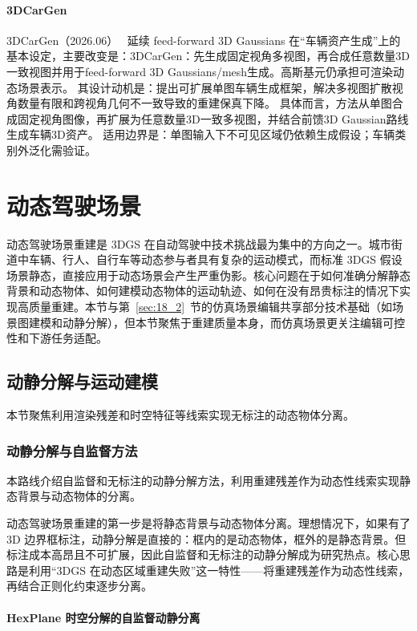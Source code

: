 \paragraph{3DCarGen}
3DCarGen（2026.06）~\cite{2606_24257} 延续 feed-forward 3D Gaussians 在“车辆资产生成”上的基本设定，主要改变是：3DCarGen：先生成固定视角多视图，再合成任意数量3D一致视图并用于feed-forward 3D Gaussians/mesh生成。高斯基元仍承担可渲染动态场景表示。
其设计动机是：提出可扩展单图车辆生成框架，解决多视图扩散视角数量有限和跨视角几何不一致导致的重建保真下降。
具体而言，方法从单图合成固定视角图像，再扩展为任意数量3D一致多视图，并结合前馈3D Gaussian路线生成车辆3D资产。
适用边界是：单图输入下不可见区域仍依赖生成假设；车辆类别外泛化需验证。
\section{动态驾驶场景}
\label{sec:18_3}

动态驾驶场景重建是 3DGS 在自动驾驶中技术挑战最为集中的方向之一。城市街道中车辆、行人、自行车等动态参与者具有复杂的运动模式，而标准 3DGS 假设场景静态，直接应用于动态场景会产生严重伪影。核心问题在于如何准确分解静态背景和动态物体、如何建模动态物体的运动轨迹、如何在没有昂贵标注的情况下实现高质量重建。本节与第~\ref{sec:18_2}~节的仿真场景编辑共享部分技术基础（如场景图建模和动静分解），但本节聚焦于重建质量本身，而仿真场景更关注编辑可控性和下游任务适配。

\subsection{动静分解与运动建模}
\label{ss:18_4}

本节聚焦利用渲染残差和时空特征等线索实现无标注的动态物体分离。

\subsubsection{动静分解与自监督方法}

本路线介绍自监督和无标注的动静分解方法，利用重建残差作为动态性线索实现静态背景与动态物体的分离。

动态驾驶场景重建的第一步是将静态背景与动态物体分离。理想情况下，如果有了 3D 边界框标注，动静分解是直接的：框内的是动态物体，框外的是静态背景。但标注成本高昂且不可扩展，因此自监督和无标注的动静分解成为研究热点。核心思路是利用``3DGS 在动态区域重建失败''这一特性——将重建残差作为动态性线索，再结合正则化约束逐步分离。

\paragraph{HexPlane 时空分解的自监督动静分离}

